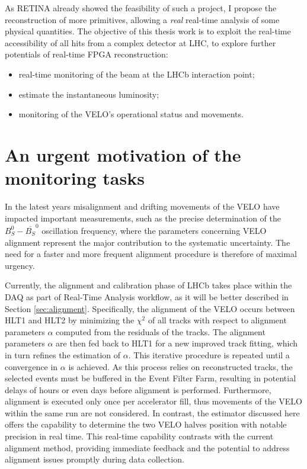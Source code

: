 As RETINA already showed the feasibility of such a project, I propose the reconstruction of more primitives, allowing a \textit{real} real-time analysis of some physical quantities. 
The objective of this thesis work is to exploit the real-time accessibility of all hits from a complex detector at LHC, to explore further potentials of real-time FPGA reconstruction: 
\begin{itemize}
\item real-time monitoring of the beam at the LHCb interaction point;
\item estimate the instantaneous luminosity;
\item monitoring of the VELO's operational status and movements.
\end{itemize}

\section{An urgent motivation of the monitoring tasks}

In the latest years misalignment and drifting movements of the VELO have impacted important measurements, such as the precise determination of the $B_S^0-\overline{B_S} ^0$ oscillation frequency, where the parameters concerning VELO alignment represent the major contribution to the systematic uncertainty\cite{b0b0soscillation}. The need for a faster and more frequent alignment procedure is therefore of maximal urgency.
    
Currently, the alignment and calibration phase of LHCb takes place within the DAQ as part of Real-Time Analysis workflow, as it will be better described in Section \ref{sec:alignment}. Specifically, the alignment of the VELO occurs between HLT1 and HLT2 by minimizing the $\chi^2$ of all tracks with respect to alignment parameters $\alpha$ computed from the residuals of the tracks. The alignment parameters $\alpha$ are then fed back to HLT1 for a new improved track fitting, which in turn refines the estimation of $\alpha$. This iterative procedure is repeated until a convergence in $\alpha$ is achieved\cite{FRUHWIRTH1987444, Frühwirth:803519}. As this process relies on reconstructed tracks, the selected events must be buffered in the Event Filter Farm, resulting in potential delays of hours or even days before alignment is performed. Furthermore, alignment is executed only once per accelerator fill, thus movements of the VELO within the same run are not considered\cite{Dziurda:2640712}. In contrast, the estimator discussed here offers the capability to determine the two VELO halves position with notable precision in real time. This real-time capability contrasts with the current alignment method, providing immediate feedback and the potential to address alignment issues promptly during data collection.

